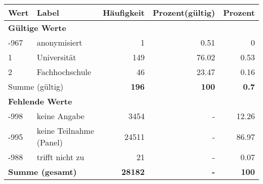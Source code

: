      \begin{longtable}{lXrrr}
     \toprule
     \textbf{Wert} & \textbf{Label} & \textbf{Häufigkeit} & \textbf{Prozent(gültig)} & \textbf{Prozent} \\
     \endhead
     \midrule
     \multicolumn{5}{l}{\textbf{Gültige Werte}}\\

     -967 &
     \multicolumn{1}{X}{ anonymisiert   } &


       \num{1} &
       \num[round-mode=places,round-precision=2]{0.51} &
         \num[round-mode=places,round-precision=2]{0} \\

     1 &
     \multicolumn{1}{X}{ Universität   } &


       \num{149} &
       \num[round-mode=places,round-precision=2]{76.02} &
         \num[round-mode=places,round-precision=2]{0.53} \\

     2 &
     \multicolumn{1}{X}{ Fachhochschule   } &


       \num{46} &
       \num[round-mode=places,round-precision=2]{23.47} &
         \num[round-mode=places,round-precision=2]{0.16} \\
     \midrule
     \multicolumn{2}{l}{Summe (gültig)} &
       \textbf{\num{196}} &
     \textbf{\num{100}} &
       \textbf{\num[round-mode=places,round-precision=2]{0.7}} \\
     \multicolumn{5}{l}{\textbf{Fehlende Werte}}\\
       -998 &
       keine Angabe &
         \num{3454} &
        - &
         \num[round-mode=places,round-precision=2]{12.26} \\
       -995 &
       keine Teilnahme (Panel) &
         \num{24511} &
        - &
         \num[round-mode=places,round-precision=2]{86.97} \\
       -988 &
       trifft nicht zu &
         \num{21} &
        - &
         \num[round-mode=places,round-precision=2]{0.07} \\
     \midrule
     \multicolumn{2}{l}{\textbf{Summe (gesamt)}} &
          \textbf{\num{28182}} &
        \textbf{-} &
        \textbf{\num{100}} \\
     \bottomrule
     \end{longtable}
     
